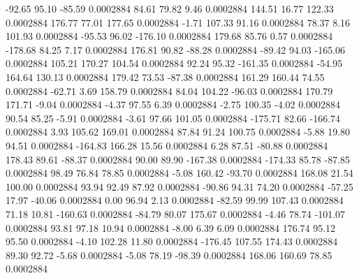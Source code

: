       -92.65       95.10      -85.59     0.0002884
       84.61       79.82        9.46     0.0002884
      144.51       16.77      122.33     0.0002884
      176.77       77.01      177.65     0.0002884
       -1.71      107.33       91.16     0.0002884
       78.37        8.16      101.93     0.0002884
      -95.53       96.02     -176.10     0.0002884
      179.68       85.76        0.57     0.0002884
     -178.68       84.25        7.17     0.0002884
      176.81       90.82      -88.28     0.0002884
      -89.42       94.03     -165.06     0.0002884
      105.21      170.27      104.54     0.0002884
       92.24       95.32     -161.35     0.0002884
      -54.95      164.64      130.13     0.0002884
      179.42       73.53      -87.38     0.0002884
      161.29      160.44       74.55     0.0002884
      -62.71        3.69      158.79     0.0002884
       84.04      104.22      -96.03     0.0002884
      170.79      171.71       -9.04     0.0002884
       -4.37       97.55        6.39     0.0002884
       -2.75      100.35       -4.02     0.0002884
       90.54       85.25       -5.91     0.0002884
       -3.61       97.66      101.05     0.0002884
     -175.71       82.66     -166.74     0.0002884
        3.93      105.62      169.01     0.0002884
       87.84       91.24      100.75     0.0002884
       -5.88       19.80       94.51     0.0002884
     -164.83      166.28       15.56     0.0002884
        6.28       87.51      -80.88     0.0002884
      178.43       89.61      -88.37     0.0002884
       90.00       89.90     -167.38     0.0002884
     -174.33       85.78      -87.85     0.0002884
       98.49       76.84       78.85     0.0002884
       -5.08      160.42      -93.70     0.0002884
      168.08       21.54      100.00     0.0002884
       93.94       92.49       87.92     0.0002884
      -90.86       94.31       74.20     0.0002884
      -57.25       17.97      -40.06     0.0002884
        0.00       96.94        2.13     0.0002884
      -82.59       99.99      107.43     0.0002884
       71.18       10.81     -160.63     0.0002884
      -84.79       80.07      175.67     0.0002884
       -4.46       78.74     -101.07     0.0002884
       93.81       97.18       10.94     0.0002884
       -8.00        6.39        6.09     0.0002884
      176.74       95.12       95.50     0.0002884
       -4.10      102.28       11.80     0.0002884
     -176.45      107.55      174.43     0.0002884
       89.30       92.72       -5.68     0.0002884
       -5.08       78.19      -98.39     0.0002884
      168.06      160.69       78.85     0.0002884
